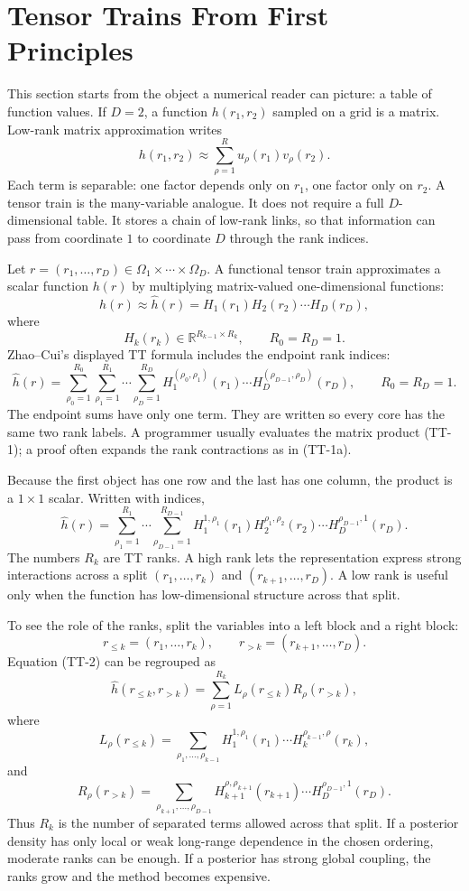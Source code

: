 \documentclass[11pt]{article}
\newcommand{\R}{\mathbb R}
\begin{document}
\section{Tensor Trains From First Principles}

This section starts from the object a numerical reader can picture: a table of
function values.  If \(D=2\), a function \(h(r_1,r_2)\) sampled on a grid is a
matrix.  Low-rank matrix approximation writes
\[
    h(r_1,r_2)\approx \sum_{\rho=1}^{R} u_\rho(r_1)v_\rho(r_2).
\]
Each term is separable: one factor depends only on \(r_1\), one factor only on
\(r_2\).  A tensor train is the many-variable analogue.  It does not require a
full \(D\)-dimensional table.  It stores a chain of low-rank links, so that
information can pass from coordinate \(1\) to coordinate \(D\) through the rank
indices.

Let \(r=(r_1,\ldots,r_D)\in\Omega_1\times\cdots\times\Omega_D\).  A functional
tensor train approximates a scalar function \(h(r)\) by multiplying
matrix-valued one-dimensional functions:
\[
    h(r)
    \approx
    \widehat h(r)
    =
    H_1(r_1)H_2(r_2)\cdots H_D(r_D),
    \tag{TT-1}
\]
where
\[
    H_k(r_k)\in \R^{R_{k-1}\times R_k},\qquad R_0=R_D=1.
\]
Zhao--Cui's displayed TT formula includes the endpoint rank indices:
\[
    \widehat h(r)
    =
    \sum_{\rho_0=1}^{R_0}\sum_{\rho_1=1}^{R_1}\cdots
    \sum_{\rho_D=1}^{R_D}
    H_1^{(\rho_0,\rho_1)}(r_1)\cdots
    H_D^{(\rho_{D-1},\rho_D)}(r_D),
    \qquad R_0=R_D=1.
    \tag{TT-1a}
\]
The endpoint sums have only one term.  They are written so every core has the
same two rank labels.  A programmer usually evaluates the matrix product
(TT-1); a proof often expands the rank contractions as in (TT-1a).

Because the first object has one row and the last has one column, the product is
a \(1\times 1\) scalar.  Written with indices,
\[
    \widehat h(r)
    =
    \sum_{\rho_1=1}^{R_1}\cdots
    \sum_{\rho_{D-1}=1}^{R_{D-1}}
    H_1^{1,\rho_1}(r_1)
    H_2^{\rho_1,\rho_2}(r_2)\cdots
    H_D^{\rho_{D-1},1}(r_D).
    \tag{TT-2}
\]
The numbers \(R_k\) are TT ranks.  A high rank lets the representation express
strong interactions across a split \((r_1,\ldots,r_k)\) and
\((r_{k+1},\ldots,r_D)\).  A low rank is useful only when the function has
low-dimensional structure across that split.

To see the role of the ranks, split the variables into a left block and a right
block:
\[
    r_{\le k}=(r_1,\ldots,r_k),\qquad
    r_{>k}=(r_{k+1},\ldots,r_D).
\]
Equation (TT-2) can be regrouped as
\[
    \widehat h(r_{\le k},r_{>k})
    =
    \sum_{\rho=1}^{R_k}
    L_\rho(r_{\le k})R_\rho(r_{>k}),
    \tag{TT-2a}
\]
where
\[
    L_\rho(r_{\le k})
    =
    \sum_{\rho_1,\ldots,\rho_{k-1}}
    H_1^{1,\rho_1}(r_1)\cdots H_k^{\rho_{k-1},\rho}(r_k),
\]
and
\[
    R_\rho(r_{>k})
    =
    \sum_{\rho_{k+1},\ldots,\rho_{D-1}}
    H_{k+1}^{\rho,\rho_{k+1}}(r_{k+1})\cdots
    H_D^{\rho_{D-1},1}(r_D).
\]
Thus \(R_k\) is the number of separated terms allowed across that split.  If a
posterior density has only local or weak long-range dependence in the chosen
ordering, moderate ranks can be enough.  If a posterior has strong global
coupling, the ranks grow and the method becomes expensive.
\end{document}
